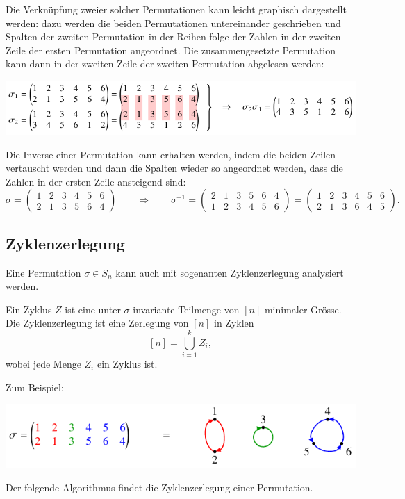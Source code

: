 Die Verknüpfung zweier solcher Permutationen kann leicht graphisch
dargestellt werden: dazu werden die beiden Permutationen
untereinander geschrieben und Spalten der zweiten Permutation
in der Reihen folge der Zahlen in der zweiten Zeile der ersten
Permutation angeordnet.
Die zusammengesetzte Permutation kann dann in der zweiten Zeile
der zweiten Permutation abgelesen werden:
\begin{center}
\includegraphics{chapters/50-permutationen/images/komposition.pdf}
\end{center}
Die Inverse einer Permutation kann erhalten werden, indem die beiden
Zeilen vertauscht werden und dann die Spalten wieder so angeordnet werden,
dass die Zahlen in der ersten Zeile ansteigend sind:
\[
\sigma = \begin{pmatrix}
1&2&3&4&5&6\\
2&1&3&5&6&4
\end{pmatrix}
\qquad\Rightarrow\qquad
\sigma^{-1}
=
\begin{pmatrix}
2&1&3&5&6&4\\
1&2&3&4&5&6
\end{pmatrix}
=
\begin{pmatrix}
1&2&3&4&5&6\\
2&1&3&6&4&5
\end{pmatrix}.
\]

\subsection{Zyklenzerlegung
\label{buch:subsection:zyklenzerlegung}}
Eine Permutation $\sigma\in S_n$ kann auch mit sogenanten Zyklenzerlegung
%
analysiert werden.

\begin{definition}
Ein Zyklus $Z$ ist eine unter $\sigma$ invariante Teilmenge von $[n]$
minimaler Grösse.
%
%
%
Die Zyklenzerlegung ist eine Zerlegung von $[n]$ in Zyklen
\[
[n]
=
\bigcup_{i=1}^k Z_i,
\]
wobei jede Menge $Z_i$ ein Zyklus ist.
\end{definition}

Zum Beispiel:
\begin{center}
\includegraphics{chapters/50-permutationen/images/zyklenzerlegung.pdf}
\end{center}
Der folgende Algorithmus findet die Zyklenzerlegung einer Permutation.

